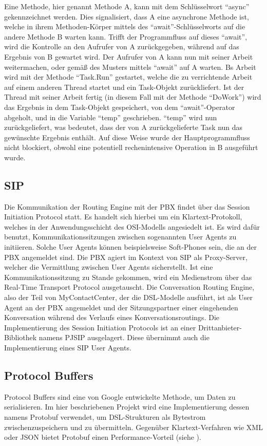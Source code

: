 Eine Methode, hier genannt Methode A, kann mit dem Schlüsselwort ``async'' gekennzeichnet werden. Dies signalisiert, dass A eine asynchrone Methode ist, welche in ihrem Methoden-Körper mittels des ``await''-Schlüsselworts auf die andere Methode B warten kann. Trifft der Programmfluss auf dieses ``await'', wird die Kontrolle an den Aufrufer von A zurückgegeben, während auf das Ergebnis von B gewartet wird. Der Aufrufer von A kann nun mit seiner Arbeit weitermachen, oder gemäß des Musters mittels ``await'' auf A warten. Bs Arbeit wird mit der Methode ``Task.Run'' gestartet, welche die zu verrichtende Arbeit auf einem anderen Thread startet und ein Task-Objekt zurückliefert. Ist der Thread mit seiner Arbeit fertig (in diesem Fall mit der Methode ``DoWork'') wird das Ergebnis in dem Task-Objekt gespeichert, von dem ``await''-Operator abgeholt, und in die Variable ``temp'' geschrieben. ``temp'' wird nun zurückgeliefert, was bedeutet, dass der von A zurückgelieferte Task nun das gewünschte Ergebnis enthält. Auf diese Weise wurde der Hauptprogrammfluss nicht blockiert, obwohl eine potentiell rechenintensive Operation in B ausgeführt wurde.


\subsection{SIP}
Die Kommunikation der Routing Engine mit der PBX findet über das Session Initiation Protocol statt. Es handelt sich hierbei um ein Klartext-Protokoll, welches in der Anwendungsschicht des OSI-Modells angesiedelt ist. Es wird dafür benutzt, Kommunikationssitzungen zwischen sogenannten User Agents zu initiieren. Solche User Agents können beispielsweise Soft-Phones sein, die an der PBX angemeldet sind. Die PBX agiert im Kontext von SIP als Proxy-Server, welcher die Vermittlung zwischen User Agents sicherstellt. Ist eine Kommunikationssitzung zu Stande gekommen, wird ein Medienstrom über das Real-Time Transport Protocol ausgetauscht. Die Conversation Routing Engine, also der Teil von MyContactCenter, der die DSL-Modelle ausführt, ist als User Agent an der PBX angemeldet und der Sitzungspartner einer eingehenden Konversation während des Verlaufs eines Konversationsroutings. Die Implementierung des Session Initiation Protocols ist an einer Drittanbieter-Bibliothek namens PJSIP ausgelagert. Diese übernimmt auch die Implementierung eines SIP User Agents. 

\subsection{Protocol Buffers}
Protocol Buffers sind eine von Google entwickelte Methode, um Daten zu serialisieren. Im hier beschriebenen Projekt wird eine Implementierung dessen namens Protobuf verwendet, um DSL-Strukturen als Bytestrom zwischenzuspeichern und zu übermitteln. Gegenüber Klartext-Verfahren wie XML oder JSON bietet Protobuf einen Performance-Vorteil (siehe \cite{Bowden:14}).


